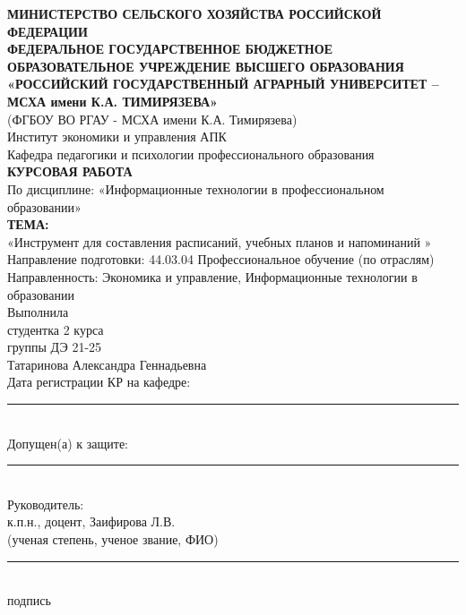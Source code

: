 \documentclass[14pt,a4paper]{article}
\begin{document}
\begin{titlepage}
\centering
\textbf{МИНИСТЕРСТВО СЕЛЬСКОГО ХОЗЯЙСТВА РОССИЙСКОЙ ФЕДЕРАЦИИ}\\[0.8cm]

\textbf{ФЕДЕРАЛЬНОЕ ГОСУДАРСТВЕННОЕ БЮДЖЕТНОЕ ОБРАЗОВАТЕЛЬНОЕ УЧРЕЖДЕНИЕ ВЫСШЕГО ОБРАЗОВАНИЯ}\\[0.6cm]

\textbf{«РОССИЙСКИЙ ГОСУДАРСТВЕННЫЙ АГРАРНЫЙ УНИВЕРСИТЕТ – МСХА имени К.А. ТИМИРЯЗЕВА»}\\[0.4cm]
(ФГБОУ ВО РГАУ - МСХА имени К.А. Тимирязева)\\[1cm]

Институт экономики и управления АПК\\
Кафедра педагогики и психологии профессионального образования\\[1.5cm]

\textbf{КУРСОВАЯ РАБОТА}\\[1cm]

По дисциплине: «Информационные технологии в профессиональном образовании»\\[0.8cm]

\textbf{ТЕМА:}\\[0.3cm]
«Инструмент для составления расписаний, учебных планов и напоминаний »\\[1.5cm]

Направление подготовки: 44.03.04 Профессиональное обучение (по отраслям)\\
Направленность: Экономика и управление, Информационные технологии в образовании\\[1.2cm]

\flushright
Выполнила\\
студентка 2 курса\\
группы ДЭ 21-25\\
Татаринова Александра Геннадьевна\\[0.8cm]

Дата регистрации КР на кафедре:\\
\rule{7cm}{0.4pt}\\[0.5cm]

Допущен(а) к защите:\\
\rule{7cm}{0.4pt}\\[0.8cm]

Руководитель:\\
к.п.н., доцент, Заифирова Л.В.\\
(ученая степень, ученое звание, ФИО)\\
\rule{7cm}{0.4pt}\\
подпись\\[0.8cm]


\end{titlepage}
\end{document}
